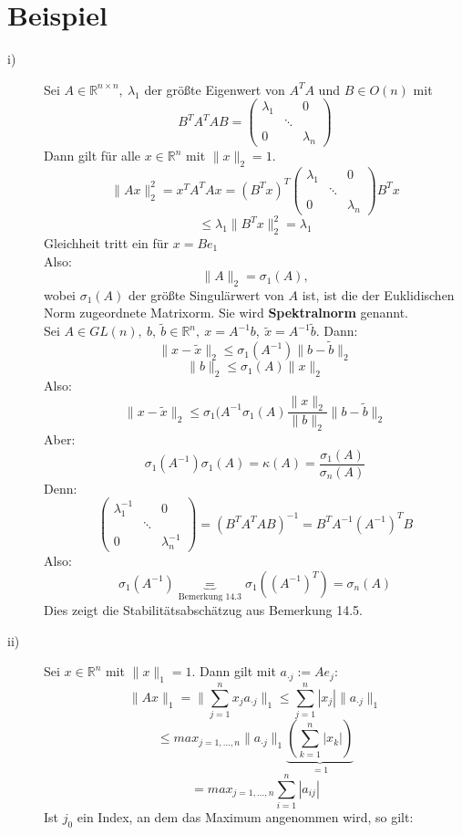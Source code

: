 \documentclass{scrbook}
\begin{document}
\section{Beispiel}
\begin{description}
\item[i)]Sei $A \in \mathbb{R}^{n \times n},\ \lambda_1$ der größte Eigenwert von $A^TA$ und $B \in O(n)$ mit
\[
B^TA^TAB=\left(
\begin{array}{ccc}
\lambda_1&&0\\
&\ddots\\
0&&\lambda_n
\end{array}
\right)
\]
Dann gilt für alle $x \in \mathbb{R}^n$ mit $\|x\|_2 =1$.
\[
\|Ax\|_2^2 = x^TA^TAx = (B^Tx)^T\left(
\begin{array}{ccc}
\lambda_1&&0\\
&\ddots\\
0&&\lambda_n
\end{array}
\right)B^Tx
\]
\[\leq \lambda_1 \|B^Tx\|^2_2=\lambda_1\]
Gleichheit tritt ein für $x = Be_1$\\
Also:
\[
\|A\|_2 = \sigma_1(A),
\]
wobei $\sigma_1(A)$ der größte Singulärwert von $A$ ist, ist die der Euklidischen Norm zugeordnete Matrixorm. Sie wird \textbf{Spektralnorm} genannt.\\
Sei $A \in GL(n),\ b,\ \tilde{b} \in \mathbb{R}^n,\ x=A^{-1}b, \ \tilde{x} = A^{-1}\tilde{b}$. Dann:
\[
\|x-\tilde{x}\|_2\leq\sigma_1(A^{-1})\|b-\tilde{b}\|_2
\]
\[
\|b\|_2 \leq \sigma_1(A) \|x\|_2
\]
Also:
\[
\|x-\tilde{x}\|_2 \leq \sigma_1(A^{-1}\sigma_1(A) \frac{\|x\|_2}{\|b\|_2}\|b-\tilde{b}\|_2
\]
Aber:
\[
\sigma_1(A^{-1})\sigma_1(A) = \kappa(A) = \frac{\sigma_1(A)}{\sigma_n(A)}
\]
Denn:
\[
\left(
\begin{array}{ccc}
\lambda^{-1}_1&&0\\
&\ddots\\
0&&\lambda^{-1}_n
\end{array}
\right) = (B^TA^TAB)^{-1} = B^TA^{-1}(A^{-1})^TB
\]
Also:
\[\sigma_1(A^{-1})\underbrace{ =}_{\text{Bemerkung 14.3}} \sigma_1((A^{-1})^T)=\sigma_n(A)
\]
Dies zeigt die Stabilitätsabschätzug aus Bemerkung 14.5.
\item[ii)] Sei $x \in \mathbb{R}^n$ mit $\|x\|_1=1$. Dann gilt mit $a_{\cdot j}:=Ae_j$:
\[
\|Ax\|_1 = \|\sum^n_{j=1}x_ja_{\cdot j}\|_1\leq \sum^n_{j=1}|x_j| \|a_{\cdot j}\|_1
\]
\[
\leq max_{j=1,...,n} \|a_{\cdot j}\|_1\underbrace{(\sum^n_{k=1}|x_k|)}_{=1}
\]
\[
= max_{j=1,...,n} \sum^n_{i=1}|a_{ij}|
\]
Ist $j_0$ ein Index, an dem das Maximum angenommen wird, so gilt:

\end{description}
\end{document}
